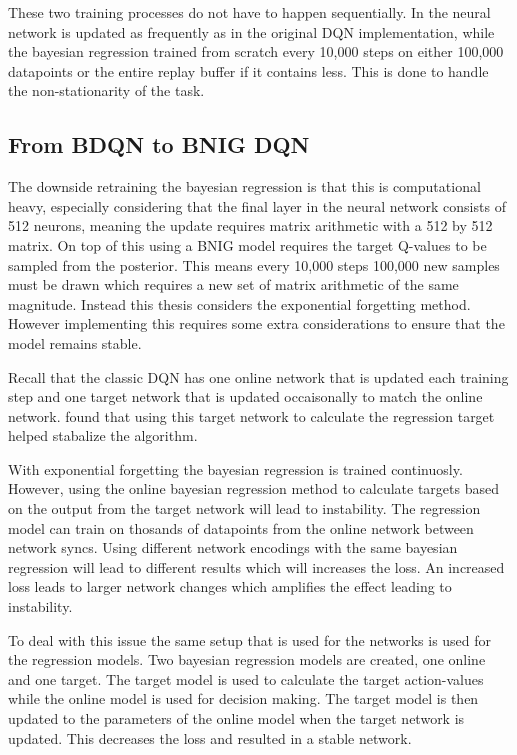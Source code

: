 These two training processes do not have to happen sequentially. In \cite{azziz_2018} the neural network is updated as frequently as in the original DQN implementation, while the bayesian regression trained from scratch every 10,000 steps on either 100,000 datapoints or the entire replay buffer if it contains less. This is done to handle the non-stationarity of the task. 

\subsection{From BDQN to BNIG DQN}

The downside retraining the bayesian regression is that this is computational heavy, especially considering that the final layer in the neural network consists of 512 neurons, meaning the update requires matrix arithmetic with a 512 by 512 matrix. On top of this using a BNIG model requires the target Q-values to be sampled from the posterior. This means every 10,000 steps 100,000 new samples must be drawn which requires a new set of matrix arithmetic of the same magnitude. Instead this thesis considers the exponential forgetting method. However implementing this requires some extra considerations to ensure that the model remains stable.

Recall that the classic DQN has one online network that is updated each training step and one target network that is updated occaisonally to match the online network. \cite{mnih_2013} found that using this target network to calculate the regression target helped stabalize the algorithm.

With exponential forgetting the bayesian regression is trained continuosly. However, using the online bayesian regression method to calculate targets based on the output from the target network will lead to instability. The regression model can train on thosands of datapoints from the online network between network syncs. Using different network encodings with the same bayesian regression will lead to different results which will increases the loss. An increased loss leads to larger network changes which amplifies the effect leading to instability.

To deal with this issue the same setup that is used for the networks is used for the regression models. Two bayesian regression models are created, one online and one target. The target model is used to calculate the target action-values while the online model is used for decision making. The target model is then updated to the parameters of the online model when the target network is updated. This decreases the loss and resulted in a stable network.

